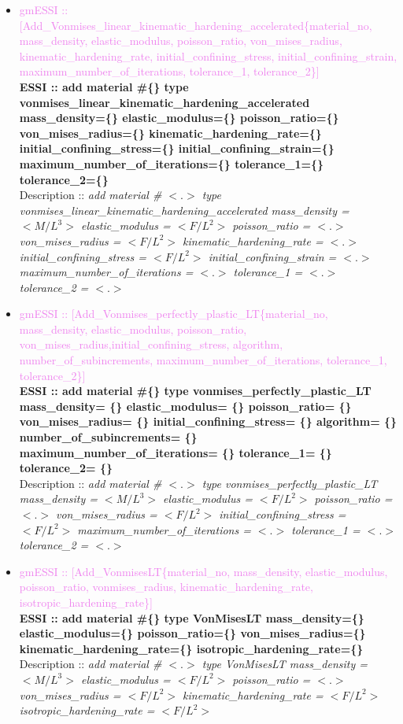 \documentclass[11pt]{article}
\begin{document}
\begin{itemize}
      \item \textcolor{violet}{gmESSI :: [Add\_Vonmises\_linear\_kinematic\_hardening\_accelerated\{material\_no, mass\_density, elastic\_modulus, poisson\_ratio, von\_mises\_radius, kinematic\_hardening\_rate, initial\_confining\_stress, initial\_confining\_strain, maximum\_number\_of\_iterations, tolerance\_1, tolerance\_2\}]}\\
      \textbf{ESSI :: add material \#\{\} type vonmises\_linear\_kinematic\_hardening\_accelerated mass\_density=\{\} elastic\_modulus=\{\} poisson\_ratio=\{\} von\_mises\_radius=\{\} kinematic\_hardening\_rate=\{\} initial\_confining\_stress=\{\} initial\_confining\_strain=\{\} maximum\_number\_of\_iterations=\{\} tolerance\_1=\{\} tolerance\_2=\{\} }\\
      Description ::  \textit{ add material \# $<.>$ type vonmises\_linear\_kinematic\_hardening\_accelerated mass\_density = $<M/L^3>$ elastic\_modulus = $<F/L^2>$ poisson\_ratio = $<.>$ von\_mises\_radius = $<F/L^2>$ kinematic\_hardening\_rate = $<.>$ initial\_confining\_stress = $<F/L^2>$ initial\_confining\_strain = $<.>$ maximum\_number\_of\_iterations = $<.>$ tolerance\_1 = $<.>$ tolerance\_2 = $<.>$} 

      \item \textcolor{violet}{gmESSI :: [Add\_Vonmises\_perfectly\_plastic\_LT\{material\_no, mass\_density, elastic\_modulus, poisson\_ratio, von\_mises\_radius,initial\_confining\_stress, algorithm, number\_of\_subincrements, maximum\_number\_of\_iterations, tolerance\_1, tolerance\_2\}]}\\
      \textbf{ESSI :: add material \#\{\} type vonmises\_perfectly\_plastic\_LT mass\_density= \{\} elastic\_modulus= \{\} poisson\_ratio= \{\}  von\_mises\_radius= \{\} initial\_confining\_stress= \{\} algorithm= \{\} number\_of\_subincrements= \{\} maximum\_number\_of\_iterations= \{\} tolerance\_1= \{\} tolerance\_2= \{\} }\\
      Description ::  \textit{ add material \# $<.>$ type vonmises\_perfectly\_plastic\_LT mass\_density = $<M/L^3>$ elastic\_modulus = $<F/L^2>$ poisson\_ratio = $<.>$ von\_mises\_radius = $<F/L^2>$ initial\_confining\_stress = $<F/L^2>$  maximum\_number\_of\_iterations = $<.>$ tolerance\_1 = $<.>$ tolerance\_2 = $<.>$} 

      \item \textcolor{violet}{gmESSI :: [Add\_VonmisesLT\{material\_no, mass\_density, elastic\_modulus, poisson\_ratio, vonmises\_radius, kinematic\_hardening\_rate, isotropic\_hardening\_rate\}]}\\
      \textbf{ESSI :: add material \#\{\} type VonMisesLT mass\_density=\{\} elastic\_modulus=\{\}  poisson\_ratio=\{\} von\_mises\_radius=\{\} kinematic\_hardening\_rate=\{\} isotropic\_hardening\_rate=\{\}}\\
      Description ::  \textit{ add material \# $<.>$ type VonMisesLT  mass\_density = $<M/L^3>$ elastic\_modulus = $<F/L^2>$  poisson\_ratio = $<.>$ von\_mises\_radius = $<F/L^2>$ kinematic\_hardening\_rate = $<F/L^2>$ isotropic\_hardening\_rate = $<F/L^2>$} 


\end{itemize}
\end{document}
